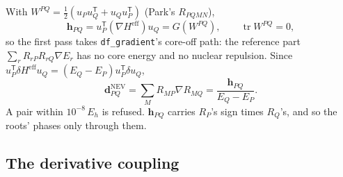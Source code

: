 \documentclass[11pt]{article}
\newcommand{\code}[1]{\texttt{#1}}
\newcommand{\Heff}{H^{\mathrm{eff}}}
\newcommand{\T}{\mathsf T}
\newcommand{\tr}{\operatorname{tr}}
\begin{document}
With $W^{PQ} = \tfrac12(u_Pu_Q^\T + u_Qu_P^\T)$ (Park's $R_{PQMN}$),
\begin{equation}
  \mathbf h_{PQ} = u_P^\T(\nabla\Heff)u_Q = G(W^{PQ}),\qquad
  \tr W^{PQ} = 0,
  \label{eq:hpq}
\end{equation}
so the first pass takes \code{df\_gradient}'s core-off path: the reference
part $\sum_r R_{rP}R_{rQ}\nabla E_r$ has no core energy and no nuclear
repulsion. Since $u_P^\T\delta\Heff u_Q = (E_Q - E_P)u_P^\T\delta u_Q$,
\begin{equation}
  \mathbf d^{\mathrm{NEV}}_{PQ} = \sum_M R_{MP}\nabla R_{MQ} = \frac{\mathbf h_{PQ}}{E_Q - E_P}.
\end{equation}
A pair within $10^{-8}\,E_h$ is refused. $\mathbf h_{PQ}$ carries
$R_P$'s sign times $R_Q$'s, and so the roots' phases only through them.

\subsection{The derivative coupling}
\end{document}
